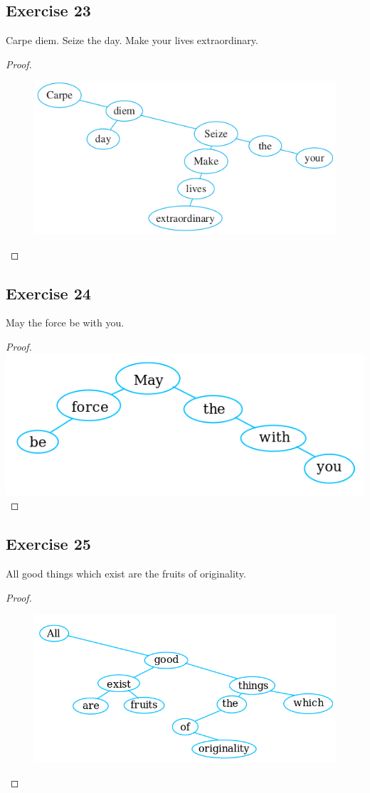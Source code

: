 \documentclass[14pt]{extarticle}
\begin{document}
\subsection{Exercise 23}
Carpe diem. Seize the day. Make your lives extraordinary.
\begin{proof}
\begin{figure}[ht!]
\centering
\includegraphics[scale=0.6]{../images/10.5.23.png}
\end{figure}
\end{proof}

\subsection{Exercise 24}
May the force be with you.
\begin{proof}
\includegraphics[scale=0.5]{../images/10.5.24.png}
\end{proof}

\subsection{Exercise 25}
All good things which exist are the fruits of originality.
\begin{proof}
\begin{figure}[ht!]
\centering
\includegraphics[scale=0.5]{../images/10.5.25.png}
\end{figure}
\end{proof}
\end{document}
